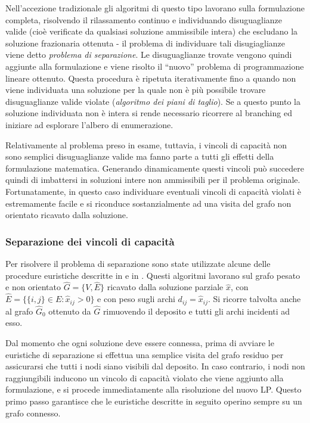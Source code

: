 \documentclass[11pt,oneside,a4paper]{article}
\begin{document}
Nell'accezione tradizionale gli algoritmi di questo tipo lavorano sulla formulazione completa,
risolvendo il rilassamento continuo e individuando disuguaglianze valide (cioè verificate da
qualsiasi soluzione ammissibile intera) che escludano la soluzione frazionaria ottenuta - il
 problema di individuare tali disugiaglianze viene detto \emph{problema di separazione}. Le
disuguaglianze trovate vengono quindi aggiunte alla formulazione e viene risolto
il ``nuovo'' problema di programmazione lineare ottenuto. Questa procedura è ripetuta iterativamente
fino a quando non viene individuata una soluzione per la quale non è più possibile trovare disuguaglianze
valide violate (\emph{algoritmo dei piani di taglio}).
Se a questo punto la soluzione individuata non è intera si rende necessario ricorrere al
branching ed iniziare ad esplorare l'albero di enumerazione.

Relativamente al problema preso in esame, tuttavia, i vincoli di capacità non sono semplici
disuguaglianze valide ma fanno parte a tutti gli effetti della formulazione matematica. Generando
dinamicamente questi vincoli può succedere quindi di imbattersi in soluzioni intere non
ammissibili per il problema originale. Fortunatamente, in questo caso individuare eventuali
vincoli di capacità violati è estremamente facile e si riconduce sostanzialmente ad una visita del
grafo non orientato ricavato dalla soluzione.

\subsubsection{Separazione dei vincoli di capacità}
Per risolvere il problema di separazione sono state utilizzate alcune delle procedure euristiche
descritte in \cite{augerat98} e in \cite{ralphs03}. Questi algoritmi lavorano sul grafo pesato
e non orientato $\hat{G} = \{V,\hat{E}\}$ ricavato dalla soluzione parziale
$\hat{x}$, con $\hat{E} = \{\{i,j\} \in E : \hat{x}_{ij} > 0\}$ e con peso sugli archi
$d_{ij} = \hat{x}_{ij}$. Si ricorre talvolta anche al grafo $\hat{G}_0$ ottenuto da $\hat{G}$ rimuovendo
il deposito e tutti gli archi incidenti ad esso.

Dal momento che ogni soluzione deve essere connessa, prima di avviare le euristiche di separazione
si effettua una semplice visita del grafo residuo per assicurarsi che tutti i nodi siano visibili
dal deposito. In caso contrario, i nodi non raggiungibili inducono un vincolo di capacità
violato che viene aggiunto alla formulazione, e si procede immediatamente alla risoluzione del
nuovo LP. Questo primo passo garantisce che le euristiche descritte in seguito operino sempre
su un grafo connesso.
\end{document}
